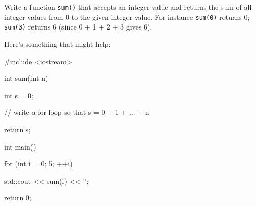 Write a function \texttt{sum()} that accepts an integer value and returns the sum of all integer values from 0 to the given integer value. For instance \texttt{sum(0)} returns 0; \texttt{sum(3)} returns 6 (since 0 + 1 + 2 + 3 gives 6).



Here's something that might help:



\begin{consolethree}[escapeinside=||]

#include <iostream>



int sum(int n)

{

    int s = 0;

    // write a for-loop so that s = 0 + 1 + ... + n

    return s;

}



int main()

{

    for (int i = 0; 5; ++i)

    {

        std::cout << sum(i) << '\n';

    }

    return 0;

}

\end{consolethree}

